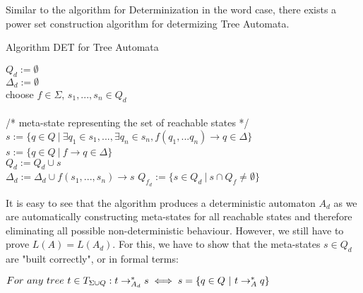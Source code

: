 \documentclass{llncs}
\begin{document}
\noindent
Similar to the algorithm for Determinization in the word case, there exists a power set construction algorithm for determizing Tree Automata.

\begin{definition}{Algorithm DET for Tree Automata \cite{tata-nfta}}\\
\begin{algorithm}[H]
	\(Q_d := \emptyset\)\\
	\(\Delta_d := \emptyset\)
	\\
		 {
			choose \( f \in \Sigma\), \(s_1,...,s_n \in Q_d\)\\
			~\\
			/* meta-state representing the set of reachable states */ \\
			 {
				\( s := \{ q \in Q ~|~ \exists q_1 \in s_1,..., \exists q_n \in s_n, f(q_1,...q_n)
			 \rightarrow q \in \Delta \} \)
			} {
				\( s := \{ q \in Q ~|~
				f \rightarrow q \in \Delta \} \)
			}
			~\\
			\(Q_d := Q_d \cup s\)\\
			\(\Delta_d := \Delta_d \cup f(s_1,...,s_n) \rightarrow s \)
		}
	\(Q_{f_d} := \{ s \in Q_d ~ | ~ s \cap Q_f \neq \emptyset \}\)\\
\end{algorithm}
\end{definition}

\pagebreak

\noindent
It is easy to see that the algorithm produces a deterministic automaton \(A_d\) as we are automatically constructing meta-states for all reachable states and therefore eliminating all possible non-deterministic behaviour. However, we still have to prove \(L(A) = L(A_d)\). For this, we have to show that the meta-states \(s \in Q_d\) are "built correctly", or in formal terms:

\begin{center}
	\(For~any~tree~t \in T_{\Sigma \cup Q}: t \rightarrow_{A_d}^* s \iff s = \{q \in Q ~|~ t \rightarrow_A^* q\}\)
\end{center}
\end{document}
